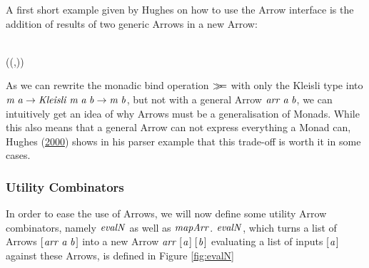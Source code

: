 \documentclass[paper=A4,twoside=true,openright,parskip=full,chapterprefix=true,headings=normal,bibliography=totoc,listof=totoc,titlepage=on,captions=tableabove,draft=false,british]{scrreprt}%
\begin{document}
A first short example given by Hughes on how to use the Arrow interface
is the addition of results of two generic Arrows in a new Arrow:


\begin{hscode}\SaveRestoreHook
{}%
%
\>[B]{}\mathbin{::}\;\Rightarrow {}\;\;\to {}\;\;\to {}\;\;\<[E]%
\\
\>[B]{}\;\;\mathrel{=}\mathbin{\&\!\&\!\&}\mathbin{>\!\!>\!\!>}\;(\lambda (,)\to {}\mathbin{+}){}\<[E]%
\ColumnHook
\end{hscode}\resethooks
\vspace{-2\baselineskip}

As we can rewrite the monadic bind operation \ensuremath{\bind } with only the
Kleisli type into \ensuremath{\Varid{m}\;\Varid{a}\to \Conid{Kleisli}\;\Varid{m}\;\Varid{a}\;\Varid{b}\to \Varid{m}\;\Varid{b}}, but not with a general
Arrow \ensuremath{\Varid{arr}\;\Varid{a}\;\Varid{b}}, we can intuitively get an idea of why Arrows must be a
generalisation of Monads. While this also means that a general Arrow can
not express everything a Monad can, Hughes
(\protect\hyperlink{ref-HughesArrows}{2000}) shows in his parser example
that this trade-off is worth it in some cases.

\hypertarget{utility-combinators}{%
\subsubsection{Utility Combinators}\label{utility-combinators}}

\label{utilfns}

In order to ease the use of Arrows, we will now define some utility
Arrow combinators, namely \ensuremath{\Varid{evalN}} as well as \ensuremath{\Varid{mapArr}}. \ensuremath{\Varid{evalN}}, which
turns a list of Arrows \ensuremath{[\mskip1.5mu \Varid{arr}\;\Varid{a}\;\Varid{b}\mskip1.5mu]} into a new Arrow \ensuremath{\Varid{arr}\;[\mskip1.5mu \Varid{a}\mskip1.5mu]\;[\mskip1.5mu \Varid{b}\mskip1.5mu]}
evaluating a list of inputs \ensuremath{[\mskip1.5mu \Varid{a}\mskip1.5mu]} against these Arrows, is defined in
Figure \ref{fig:evalN}
\end{document}
